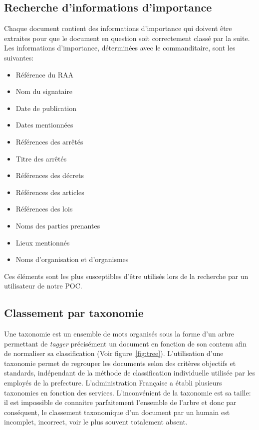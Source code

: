 \subsection{Recherche d'informations d'importance}\label{infosImp}
Chaque document contient des informations d'importance qui doivent être extraites pour que le document en question soit correctement classé par la suite.
Les informations d'importance, déterminées avec le commanditaire, sont les suivantes:
\begin{itemize}
\item Référence du RAA
\item Nom du signataire
\item Date de publication
\item Dates mentionnées
\item Références des arrêtés
\item Titre des arrêtés
\item Références des décrets
\item Références des articles
\item Références des lois
\item Noms des parties prenantes
\item Lieux mentionnés
\item Noms d'organisation et d'organismes
\end{itemize}

Ces éléments sont les plus susceptibles d'être utilisés lors de la recherche par un utilisateur de notre POC\@.



\subsection{Classement par taxonomie}
Une taxonomie est un ensemble de mots organisés sous la forme d'un arbre permettant de \textit{tagger} précisément un document en fonction de son contenu afin de normaliser sa classification (Voir figure~\ref{fig:tree}).
L'utilisation d'une taxonomie permet de regrouper les documents selon des critères objectifs et standards, indépendant de la méthode de classification individuelle utilisée par les employés de la prefecture.
L'administration Française a établi plusieurs taxonomies en fonction des services.
L'inconvénient de la taxonomie est sa taille: il est impossible de connaitre parfaitement l'ensemble de l'arbre et donc par conséquent, le classement taxonomique d'un document par un humain est incomplet, incorrect, voir le plus souvent totalement absent.

